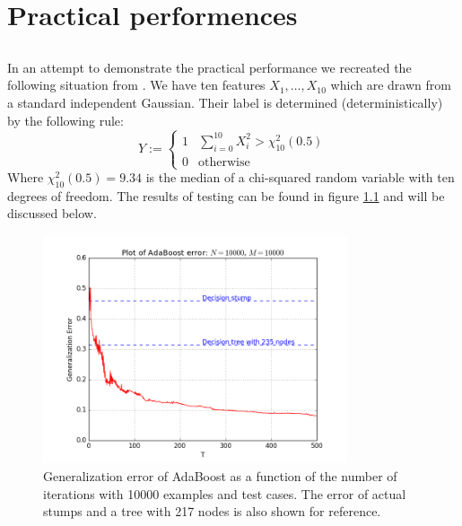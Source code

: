 
\chapter{Practical performences}
\label{chap:pracPerf}

\section{\adaB}
\label{subsec:AdaPracPerf}
In an attempt to demonstrate the practical performance we recreated the following situation from \cite{Hastie2009}. We have ten features $X_1,\ldots,X_{10}$ which are drawn from a standard independent Gaussian. Their label is determined (deterministically) by the following rule: $$Y:=\begin{cases}
1 & \sum_{i=0}^{10} X^2_i > \chi_{10}^2(0.5)\\
0 & \text{otherwise}
\end{cases}$$ Where $\chi_{10}^2(0.5)=9.34$ is the median of a chi-squared random variable with ten degrees of freedom. The results of testing can be found in figure \ref{fig:adaB} and will be discussed below. 

\begin{figure}[!ht]
  \centering
      \includegraphics[width=0.8\textwidth]{generated/prettyLong.png}
  \caption{Generalization error of AdaBoost as a function of the number of iterations with 10000 examples and test cases. The error of actual stumps and a tree with 217 nodes is also shown for reference.}
      \label{fig:adaB}
\end{figure}

